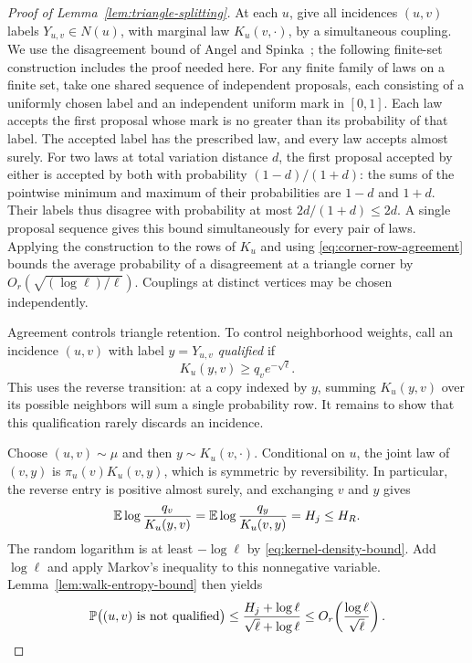 \begin{proof}[Proof of Lemma~\ref{lem:triangle-splitting}]
At each $u$, give all incidences $(u,v)$ labels $Y_{u,v}\in N(u)$,
with marginal law $K_u(v,\cdot)$, by a simultaneous coupling.  We use
the disagreement bound of Angel and Spinka~\cite[Theorem~2]{AngelSpinka}; the
following finite-set construction includes the proof needed here.
For any finite family of laws on a finite set, take one shared sequence
of independent proposals, each consisting of a uniformly chosen label
and an independent uniform mark in $[0,1]$.  Each law accepts the first
proposal whose mark is no greater than its probability of that label.
The accepted label has the prescribed law, and every law accepts almost
surely.  For two laws at total variation distance $d$, the first
proposal accepted by either is accepted by both with probability
$(1-d)/(1+d)$: the sums of the pointwise minimum and maximum of their
probabilities are $1-d$ and $1+d$.  Their labels thus disagree with
probability at most $2d/(1+d)\le2d$.  A single proposal sequence gives
this bound simultaneously for every pair of laws.  Applying the
construction to the rows of $K_u$ and using
\eqref{eq:corner-row-agreement} bounds the average probability of a
disagreement at a triangle corner by
$O_r(\sqrt{(\log\ell)/\ell})$.  Couplings at distinct vertices may
be chosen independently.

Agreement controls triangle retention.  To control neighborhood
weights, call an incidence $(u,v)$ with label $y=Y_{u,v}$
\emph{qualified} if
\begin{equation}
 K_u(y,v)\ge q_ve^{-\sqrt\ell}.
 \label{eq:reverse-qualification}
\end{equation}
This uses the reverse transition: at a copy indexed by $y$, summing
$K_u(y,v)$ over its possible neighbors will sum a single probability
row.  It remains to show that this qualification rarely discards an
incidence.

Choose $(u,v)\sim\mu$ and then $y\sim K_u(v,\cdot)$.  Conditional
on $u$, the joint law of $(v,y)$ is $\pi_u(v)K_u(v,y)$, which is
symmetric by reversibility.  In particular, the reverse entry is
positive almost surely, and exchanging $v$ and $y$ gives
\begin{equation}
 \mathbb E\log\frac{q_v}{K_u(y,v)}
  =\mathbb E\log\frac{q_y}{K_u(v,y)}=H_j\le H_R.
 \label{eq:reverse-entropy}
\end{equation}
The random logarithm is at least $-\log\ell$ by
\eqref{eq:kernel-density-bound}.  Add $\log\ell$ and apply Markov's
inequality to this nonnegative variable.  Lemma~\ref{lem:walk-entropy-bound}
then yields
\begin{equation}
 \mathbb P\bigl((u,v)\text{ is not qualified}\bigr)
 \le\frac{H_j+\log\ell}{\sqrt\ell+\log\ell}
 \le O_r\!\left(\frac{\log\ell}{\sqrt\ell}\right).
 \label{eq:qualification-failure}
\end{equation}


\end{proof}
